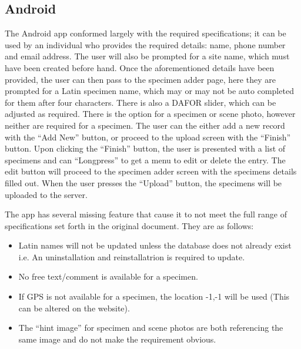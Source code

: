 \subsection{Android}
    The Android app conformed largely with the required specifications; it can be used by an individual who provides the required details: name, phone number and email address. The user will also be prompted for a site name, which must have been created before hand. Once the aforementioned details have been provided, the user can then pass to the specimen adder page, here they are prompted for a Latin specimen name, which may or may not be auto completed for them after four characters. There is also a DAFOR slider, which can be adjusted as required. There is the option for a specimen or scene photo, however neither are required for a specimen. The user can the either add a new record with the ``Add New'' button, or proceed to the upload screen with the ``Finish'' button. Upon clicking the ``Finish'' button, the user is presented with a list of specimens and can ``Longpress'' to get a menu to edit or delete the entry. The edit button will proceed to the specimen adder screen with the specimens details filled out. When the user presses the ``Upload'' button,  the specimens will be uploaded to the server. 

    The app has several missing feature that cause it to not meet the full range of specifications set forth in the original document. They are as follows: 
    \begin{itemize}
        \item Latin names will not be updated unless the database does not already exist i.e. An uninstallation and reinstallatrion is required to update.
        \item No free text/comment is available for a specimen.
        \item If GPS is not available for a specimen, the location -1,-1 will be used (This can be altered on the website).
        \item The ``hint image'' for specimen and scene photos are both referencing the same image and do not make the requirement obvious.
    \end{itemize}


